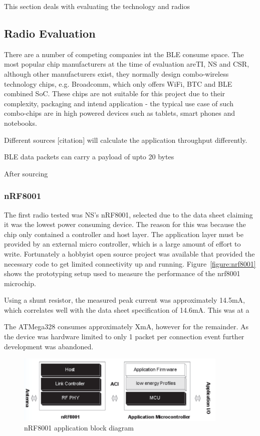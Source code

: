 \documentclass[]{article}
\begin{document}
{This section deals with evaluating the technology and radios

\subsection{Radio Evaluation}

There are a number of competing companies int the \ac{BLE} consume space. The most popular chip manufacturers at the time of evaluation are\ac{TI}, \ac{NS} and \ac{CSR}, although  other manufacturers exist, they normally design combo-wireless technology chips, e.g. Broadcomm, which only offers WiFi, \ac{BTC} and \ac{BLE} combined \ac{SoC}. These chips are not suitable for this project due to their complexity, packaging and intend application - the typical use case of such combo-chips are in high powered devices such as tablets, smart phones and notebooks. 

Different sources [citation] will calculate the application throughput differently. 

\ac{BLE} data packets can carry a payload of upto 20 bytes

After sourcing
\subsubsection{nRF8001}
The first radio tested was \ac{NS}'s nRF8001, selected due to the data sheet claiming it was the lowest power consuming device. The reason for this was because the chip only contained a controller and host layer. The application layer must be provided by an external micro controller, which is a large amount of effort to write. Fortunately a hobbyist open source project\cite{Guan2013} was available that provided the necessary code to get limited connectivity up and running. Figure~\ref{figure:nrf8001} shows the prototyping setup used to measure the performance of the nrf8001 microchip. \cite{nrf8001}

Using a shunt resistor, the measured peak current was approximately 14.5mA, which correlates well with the data sheet specification of 14.6mA. This was at a 

The ATMega328 consumes approximately XmA, however for the remainder. As the device was hardware limited to only 1 packet per connection event further development was abandoned.



\begin{figure}[htb]
	\begin{center}
		\includegraphics[width = 0.9\textwidth]{nrf8001stack}
	\end{center}
	\caption{nRF8001 application block diagram }
	\label{fig:nrf8001stack}
\end{figure}


}
\end{document}
